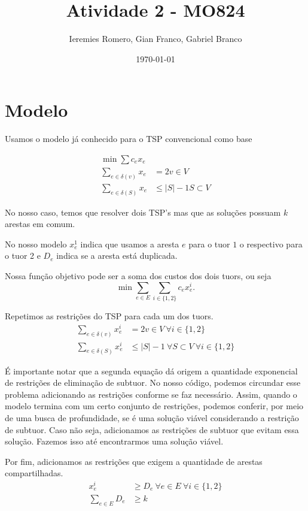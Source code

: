 \documentclass[11pt]{article}
\author{Ieremies Romero, Gian Franco, Gabriel Branco}
\date{\today}
\title{Atividade 2 - MO824}
\theoremstyle{definition}
\theoremstyle{definition}
\theoremstyle{remark}
\theoremstyle{remark}
\theoremstyle{remark}
\theoremstyle{remark}
\theoremstyle{definition}
\begin{document}
\maketitle


\section*{Modelo}
\label{sec:org5ad2af7}

Usamos o modelo já conhecido para o TSP convencional como base

\begin{align*}
\min \sum c_{e} x_{e}& \\
\sum \limits_{e \in \delta(v)} x_{e} &= 2 v \in V \\
\sum \limits_{e \in \delta(S)} x_{e} &\leq |S| -1 S \subset V
\end{align*}

No nosso caso, temos que resolver dois TSP's mas que as soluções possuam \(k\) arestas em comum.

No nosso modelo \(x_{e}^{1}\) indica que usamos a aresta \(e\) para o tuor \(1\) o respectivo para o tuor 2 e \(D_{e}\) indica se a aresta está duplicada.

Nossa função objetivo pode ser a soma dos custos dos dois tuors, ou seja
\[  \min \sum \limits_{e \in E} \sum \limits_{i \in \{1,2\}} c_{e} x_{e}^{i}. \]

Repetimos as restrições do TSP para cada um dos tuors.
\begin{align*}
\sum \limits_{e \in \delta(v)} x_{e}^{i} &= 2 v \in V \ \forall i \in \{1,2\} \\
\sum \limits_{e \in \delta(S)} x_{e}^{i} &\leq |S| -1 \ \forall S \subset V \ \forall i \in \{1,2\}
\end{align*}

É importante notar que a segunda equação dá origem a quantidade exponencial de restrições de eliminação de subtuor. No nosso código, podemos circundar esse problema adicionando as restrições conforme se faz necessário. Assim, quando o modelo termina com um certo conjunto de restrições, podemos conferir, por meio de uma busca de profundidade, se é uma solução viável considerando a restrição de subtuor. Caso não seja, adicionamos as restrições de subtuor que evitam essa solução. Fazemos isso até encontrarmos uma solução viável.

Por fim, adicionamos as restrições que exigem a quantidade de arestas compartilhadas.
\begin{align*}
x_{e}^{i} &\geq D_{e} \ \forall e \in E \ \forall i \in \{1,2\} \\
\sum \limits_{e \in E} D_{e} &\geq k
\end{align*}
\end{document}
